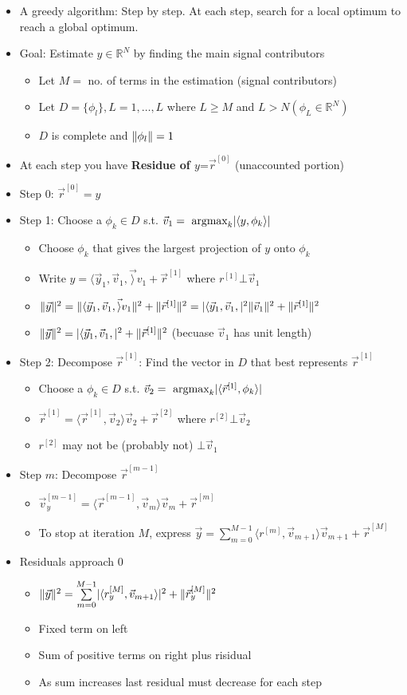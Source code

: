 \documentclass{article}\usepackage{amsmath,amssymb,amsthm,tikz,tkz-graph,color,chngpage,soul,hyperref,csquotes,graphicx,floatrow,framed,scrextend,mathtools,mathrsfs}\newcommand*{\QEDB}{\hfill\ensuremath{\square}}\newtheorem*{prop}{Proposition}\renewcommand{\theenumi}{\alph{enumi}}\usepackage[shortlabels]{enumitem}\usepackage[nobreak=true]{mdframed}\usetikzlibrary{matrix,calc}\MakeOuterQuote{"}\usepackage[margin=0.75in]{geometry} \newtheorem{theorem}{Theorem}\newcommand{\Z}{\mathbb Z}\newcommand{\R}{\mathbb R}\newcommand{\Q}{\mathbb Q}\newcommand{\N}{\mathbb N}\newcommand{\x}[1]{\textrm{#1}}\newcommand{\xs}[1]{\textrm{ #1 }}\newcommand{\pr}{\textrm{Pr}}
\newcommand{\sumlim}[3]{\sum\limits_{#1}^{#2}#3}
\newcommand{\set}[1]{\{#1\}}
\newcommand{\inprod}[2]{\langle #1, #2\rangle}
\DeclarePairedDelimiter{\abs}{\lvert}{\rvert}
\DeclarePairedDelimiter{\norm}{\lVert}{\rVert}
\newcommand{\items}[1]{\begin{itemize}#1\end{itemize}}
\begin{document}
\items{
    \item A greedy algorithm: Step by step. At each step, search for a local optimum to reach a global optimum.
    \item Goal: Estimate $y\in\R^N$ by finding the main signal contributors
    \items{
        \item Let $M=$ no. of terms in the estimation (signal contributors)
        \item Let $D=\set{\phi_l}, L=1,\ldots,L$ where $L\ge M$ and $L>N (\phi_L\in\R^N)$
        \item $D$ is complete and $\norm{\phi_l}=1$
    }
    \item At each step you have \textbf{Residue of $y$}=$\vec{r}^{[0]}$ (unaccounted portion)
    \item Step 0: $\vec{r}^{[0]}=y$
    \item Step 1: Choose a $\phi_k\in D$ s.t. $\vec{v}_1=\x{ argmax}_k\abs{\inprod{y}{\phi_k}}$
    \items{
        \item Choose $\phi_k$ that gives the largest projection of $y$ onto $\phi_k$
        \item Write $y=\inprod{\vec{y}_1, \vec{v}_1}\vec{v}_1+\vec{r}^{[1]}$ where $r^{[1]}\bot \vec{v}_1$
        \item $\norm{\vec{y}}^2=\norm{\inprod{\vec{y}_1, \vec{v}_1}\vec{v}_1}^2+\norm{\vec{r}^{[1]}}^2=\abs{\inprod{\vec{y}_1, \vec{v}_1}}^2\norm{\vec{v}_1}^2+\norm{\vec{r}^{[1]}}^2$
        \item $\norm{\vec{y}}^2=\abs{\inprod{\vec{y}_1, \vec{v}_1}}^2+\norm{\vec{r}^{[1]}}^2$ (becuase $\vec{v}_1$ has unit length)
    }
    \item Step 2: Decompose $\vec{r}^{[1]}$: Find the vector in $D$ that best represents $\vec{r}^{[1]}$
    \items{
        \item Choose a $\phi_k\in D$ s.t. $\vec{v}_2=\x{ argmax}_k\abs{\inprod{\vec{r}^{[1]}}{\phi_k}}$
        \item $\vec{r}^{[1]}=\inprod{\vec{r}^{[1]}}{\vec{v}_2}\vec{v}_2+\vec{r}^{[2]}$ where $r^{[2]}\bot \vec{v}_2$
        \item $r^{[2]}$ may not be (probably not) $\bot \vec{v}_1$
    }
    \item Step $m$: Decompose $\vec{r}^{[m-1]}$
    \items{
        \item $\vec{v}_y^{[m-1]}=\inprod{\vec{r}^{[m-1]}}{\vec{v}_m}\vec{v}_m+\vec{r}^{[m]}$
        \item To stop at iteration $M$, express $\vec{y}=\sumlim{m=0}{M-1}{\inprod{r^{[m]}}{\vec{v}_{m+1}}\vec{v}_{m+1}}+\vec{r}^{[M]}$
    }
    \item Residuals approach 0
    \items{
        \item $\norm{\vec{y}}^2=\sumlim{m=0}{M-1}{\abs{\inprod{r_y^{[M]}}{\vec{v}_{m+1}}}^2+\norm{\vec{r}_y^{[M]}}^2}$
        \item Fixed term on left
        \item Sum of positive terms on right plus risidual
        \item As sum increases last residual must decrease for each step
    }
}
\end{document}
